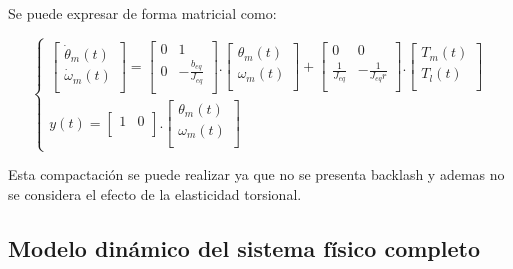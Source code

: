 \documentclass{article}
\begin{document}
Se puede expresar de forma matricial como:

\begin{equation}
\begin{cases}
    \begin{bmatrix}
        \dot{\theta}_{m}(t)\\
        \dot{\omega}_{m}(t)\\
    \end{bmatrix}
    =
    \begin{bmatrix}
        0 & 1\\
        0 & -\frac{b_{eq}}{J_{eq}}\\
    \end{bmatrix}.
    \begin{bmatrix}
        \theta_{m}(t)\\
        \omega_{m}(t)\\
    \end{bmatrix}
    +
    \begin{bmatrix}
        0 & 0\\
        \frac{1}{J_{eq}} & -\frac{1}{J_{eq}r}\\
    \end{bmatrix}.
    \begin{bmatrix}
        T_{m}(t)\\
        T_{l}(t)\\
    \end{bmatrix}\\
    y(t) = 
    \begin{bmatrix} 1 & 0\\ \end{bmatrix} .
    \begin{bmatrix} \theta_{m}(t)\\ \omega_{m}(t)\\ \end{bmatrix}
\end{cases}
\end{equation}

Esta compactación se puede realizar ya que no se presenta backlash y ademas no se considera el efecto de 
la elasticidad torsional.


\subsection{Modelo dinámico del sistema físico completo}

\end{document}
